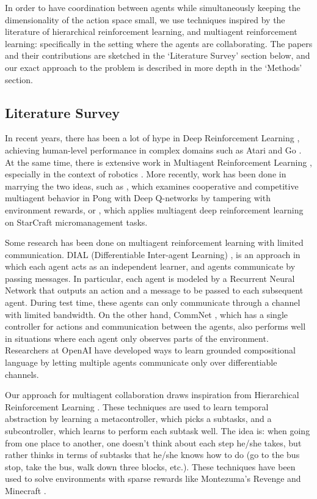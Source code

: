 \documentclass{article}
\begin{document}
In order to have coordination between agents while
simultaneously keeping the dimensionality
of the action space small, we use techniques inspired
by the literature of hierarchical reinforcement learning,
and multiagent reinforcement learning: specifically in
the setting where the agents are collaborating.
The papers and their contributions are sketched in
the `Literature Survey' section below, and our exact
approach to the problem is described in more depth
in the `Methods' section.

\subsection*{Literature Survey}

In recent years, there has been a lot of hype in Deep
Reinforcement Learning \cite{mnih2015human}, achieving 
human-level performance in complex domains such as Atari
\cite{mnih2013playing} and Go \cite{silver2016mastering}. At
the same time, there is extensive work in Multiagent 
Reinforcement Learning \cite{busoniu2008comprehensive},
especially in the context of robotics \cite{spaan2002high,
 fox2000probabilistic, mataric1997reinforcement}. More recently,
work has been done in marrying the two ideas, such as
\cite{tampuu2017multiagent}, which examines cooperative 
and competitive multiagent behavior in Pong with Deep Q-networks by
tampering with environment rewards, or
\cite{usunier2016episodic}, which applies multiagent deep
reinforcement learning on StarCraft micromanagement tasks.


Some research has been done on multiagent reinforcement learning
with limited communication. DIAL (Differentiable Inter-agent Learning) \cite{foerster2016learning},
is an approach in which
each agent acts as an independent learner, and agents communicate
by passing messages. In particular, each agent is modeled by
a Recurrent Neural Network that outputs an action and a message
to be passed to each subsequent agent. During test time, these
agents can only communicate through a channel with limited bandwidth.
On the other hand, CommNet \cite{sukhbaatar2016learning}, which
has a single controller for actions and communication
between the agents, also performs well in situations where each agent only
observes parts of the environment. Researchers at OpenAI
have developed ways to learn grounded compositional language
\cite{mordatch2017emergence} by letting multiple agents
communicate only over differentiable channels.


Our approach for multiagent collaboration draws inspiration from
Hierarchical Reinforcement Learning \cite{kulkarni2016hierarchical}. These techniques are used to learn
temporal abstraction by learning a metacontroller, which picks
a subtasks, and a subcontroller, which learns to perform each
subtask well. The idea is: when going from one place to another,
one doesn't think about each step he/she takes, but rather
thinks in terms of subtasks that he/she knows how to do (go to
the bus stop, take the bus, walk down three blocks, etc.).
These techniques have been used to solve environments with
sparse rewards like Montezuma's Revenge and Minecraft
\cite{tessler2016deep}.
\end{document}
